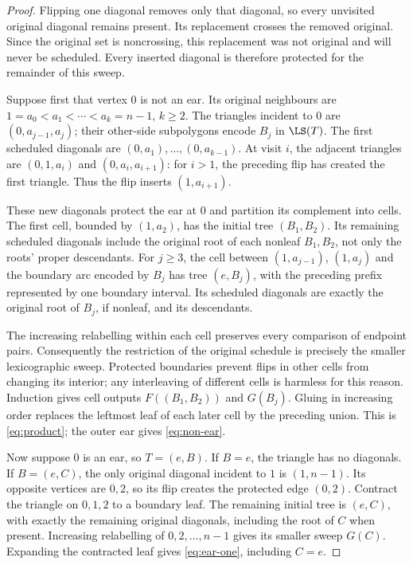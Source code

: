 \begin{proof}
Flipping one diagonal removes only that diagonal, so every unvisited
original diagonal remains present. Its replacement crosses the removed
original. Since the original set is noncrossing, this replacement was
not original and will never be scheduled. Every inserted diagonal is
therefore protected for the remainder of this sweep.

Suppose first that vertex \(0\) is not an ear. Its original neighbours
are \(1=a_0<a_1<\cdots<a_k=n-1\), \(k\ge2\). The triangles incident to
\(0\) are \((0,a_{j-1},a_j)\); their other-side subpolygons encode
\(B_j\) in \(\LS(T)\). The first scheduled diagonals are
\((0,a_1),\ldots,(0,a_{k-1})\). At visit \(i\), the adjacent triangles are
\((0,1,a_i)\) and \((0,a_i,a_{i+1})\): for \(i>1\), the preceding flip
has created the first triangle. Thus the flip inserts \((1,a_{i+1})\).

These new diagonals protect the ear at \(0\) and partition its complement
into cells. The first cell, bounded by \((1,a_2)\), has the initial tree
\((B_1,B_2)\). Its remaining scheduled diagonals include the original
root of each nonleaf \(B_1,B_2\), not only the roots' proper descendants.
For \(j\ge3\), the cell between \((1,a_{j-1})\), \((1,a_j)\) and the
boundary arc encoded by \(B_j\) has tree \((e,B_j)\), with the preceding
prefix represented by one boundary interval. Its scheduled diagonals are
exactly the original root of \(B_j\), if nonleaf, and its descendants.

The increasing relabelling within each cell preserves every comparison
of endpoint pairs. Consequently the restriction of the original schedule
is precisely the smaller lexicographic sweep. Protected boundaries prevent
flips in other cells from changing its interior; any interleaving of
different cells is harmless for this reason. Induction gives cell outputs
\(F((B_1,B_2))\) and \(G(B_j)\). Gluing in increasing order replaces the
leftmost leaf of each later cell by the preceding union. This is
\eqref{eq:product}; the outer ear gives \eqref{eq:non-ear}.

Now suppose \(0\) is an ear, so \(T=(e,B)\). If \(B=e\), the triangle
has no diagonals. If \(B=(e,C)\), the only original diagonal incident to
\(1\) is \((1,n-1)\). Its opposite vertices are \(0,2\), so its flip
creates the protected edge \((0,2)\). Contract the triangle on \(0,1,2\)
to a boundary leaf. The remaining initial tree is \((e,C)\), with
exactly the remaining original diagonals, including the root of \(C\)
when present. Increasing relabelling of \(0,2,\ldots,n-1\) gives its
smaller sweep \(G(C)\). Expanding the contracted leaf gives
\eqref{eq:ear-one}, including \(C=e\).


\end{proof}
